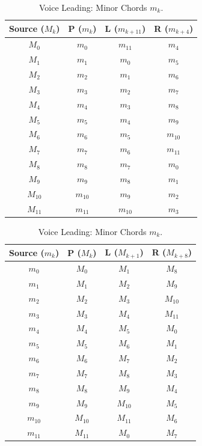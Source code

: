 \documentclass[12pt,letterpaper]{amsart}
\begin{document}
\begin{table}[H]
\centering
\scriptsize
\renewcommand{\arraystretch}{1.2}
\begin{minipage}{0.48\textwidth}
\centering
\begin{tabular}{|c||c|c|c|}
\hline
\textbf{Source} ($M_k$) & \textbf{P} ($m_k$) & \textbf{L} ($m_{k+11}$) & \textbf{R} ($m_{k+4}$) \\
\hline
$M_0$ & $m_0$ & $m_{11}$ & $m_4$ \\
$M_1$ & $m_1$ & $m_{0}$ & $m_5$ \\
$M_2$ & $m_2$ & $m_{1}$ & $m_6$ \\
$M_3$ & $m_3$ & $m_{2}$ & $m_7$ \\
$M_4$ & $m_4$ & $m_{3}$ & $m_8$ \\
$M_5$ & $m_5$ & $m_{4}$ & $m_9$ \\
$M_6$ & $m_6$ & $m_{5}$ & $m_{10}$ \\
$M_7$ & $m_7$ & $m_{6}$ & $m_{11}$ \\
$M_8$ & $m_8$ & $m_{7}$ & $m_{0}$ \\
$M_9$ & $m_9$ & $m_{8}$ & $m_{1}$ \\
$M_{10}$ & $m_{10}$ & $m_{9}$ & $m_{2}$ \\
$M_{11}$ & $m_{11}$ & $m_{10}$ & $m_{3}$ \\
\hline
\end{tabular}
\caption{\scriptsize Voice Leading: Major Chords $M_k$.}
\label{tab:far_wide_major}
\end{minipage}
\hfill
\begin{minipage}{0.48\textwidth}
\centering
\begin{tabular}{|c||c|c|c|}
\hline
\textbf{Source} ($m_k$) & \textbf{P} ($M_k$) & \textbf{L} ($M_{k+1}$) & \textbf{R} ($M_{k+8}$) \\
\hline
$m_0$ & $M_0$ & $M_1$ & $M_8$ \\
$m_1$ & $M_1$ & $M_2$ & $M_9$ \\
$m_2$ & $M_2$ & $M_3$ & $M_{10}$ \\
$m_3$ & $M_3$ & $M_4$ & $M_{11}$ \\
$m_4$ & $M_4$ & $M_5$ & $M_{0}$ \\
$m_5$ & $M_5$ & $M_6$ & $M_{1}$ \\
$m_6$ & $M_6$ & $M_7$ & $M_{2}$ \\
$m_7$ & $M_7$ & $M_8$ & $M_{3}$ \\
$m_8$ & $M_8$ & $M_9$ & $M_{4}$ \\
$m_9$ & $M_9$ & $M_{10}$ & $M_{5}$ \\
$m_{10}$ & $M_{10}$ & $M_{11}$ & $M_{6}$ \\
$m_{11}$ & $M_{11}$ & $M_{0}$ & $M_{7}$ \\
\hline
\end{tabular}
\caption{\scriptsize Voice Leading: Minor Chords $m_k$.}
\label{tab:far_wide_minor}
\end{minipage}
\end{table}
\end{document}
